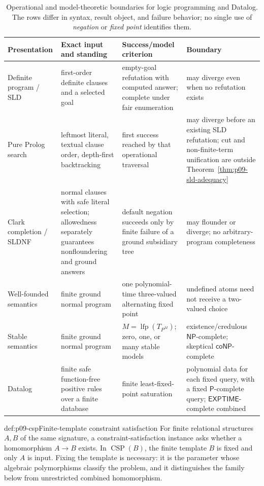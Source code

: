 \begin{table}[htbp]
\centering\scriptsize
\begin{tabularx}{\textwidth}{@{}l X X X@{}}
\toprule
Presentation & Exact input and standing & Success/model criterion & Boundary \\
\midrule
Definite program / SLD & first-order definite clauses and a selected goal &
empty-goal refutation with computed answer; complete under fair enumeration &
may diverge even when no refutation exists \\
Pure Prolog search & leftmost literal, textual clause order, depth-first
backtracking & first success reached by that operational traversal & may
diverge before an existing SLD refutation; cut and non-finite-term unification
are outside Theorem~\ref{thm:p09-sld-adequacy} \\
Clark completion / SLDNF & normal clauses with safe literal selection;
allowedness separately guarantees nonfloundering and ground answers &
default negation succeeds only by finite failure of a ground subsidiary tree &
may flounder or diverge; no arbitrary-program completeness \\
Well-founded semantics & finite ground normal program &
one polynomial-time three-valued alternating fixed point &
undefined atoms need not receive a two-valued choice \\
Stable semantics & finite ground normal program &
\(M=\operatorname{lfp}(T_{P^M})\); zero, one, or many stable models &
existence/credulous \(\mathsf{NP}\)-complete; skeptical
\(\mathsf{coNP}\)-complete \\
Datalog & finite safe function-free positive rules over a finite database &
finite least-fixed-point saturation &
polynomial data for each fixed query, with a fixed \(\mathsf P\)-complete
query; \(\mathsf{EXPTIME}\)-complete combined \\
\bottomrule
\end{tabularx}
\caption{Operational and model-theoretic boundaries for logic programming and
Datalog.  The rows differ in syntax, result object, and failure behavior; no
single use of \emph{negation} or \emph{fixed point} identifies them.}
\label{tab:p09-logic-programming}
\end{table}

\begin{hbdefinition}{def:p09-csp}{Finite-template constraint satisfaction}
For finite relational structures \(A,B\) of the same signature, a
constraint-satisfaction instance asks whether a homomorphism \(A\to B\)
exists.  In \(\operatorname{CSP}(B)\), the finite template \(B\) is fixed and
only \(A\) is input.  Fixing the template is necessary: it is the parameter
whose algebraic polymorphisms classify the problem, and it distinguishes the
family below from unrestricted combined homomorphism.
\end{hbdefinition}

